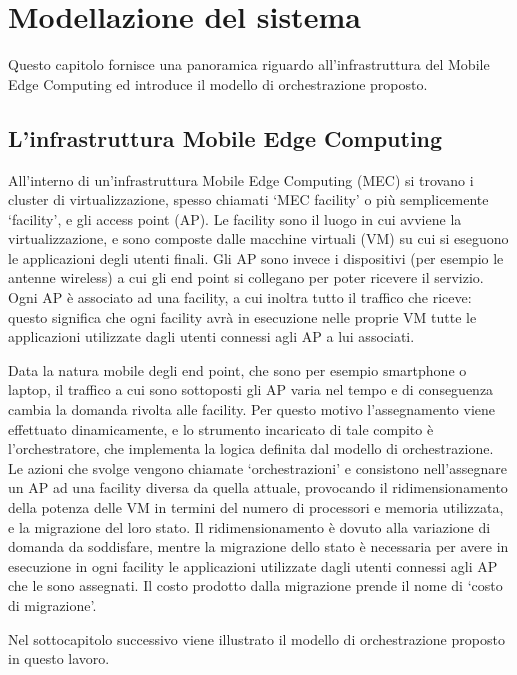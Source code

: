 \chapter{Modellazione del sistema}
\label{cap:modellazione-sistema}

Questo capitolo fornisce una panoramica riguardo all'infrastruttura del Mobile Edge Computing ed introduce il modello di orchestrazione proposto.


%
%
\section{L'infrastruttura Mobile Edge Computing}
\label{sec:infrastruttura-mec}

All'interno di un'infrastruttura Mobile Edge Computing (MEC) si trovano i cluster di virtualizzazione, spesso chiamati `MEC facility' o più semplicemente `facility', e gli access point (AP). Le facility sono il luogo in cui avviene la virtualizzazione, e sono composte dalle macchine virtuali (VM) su cui si eseguono le applicazioni degli utenti finali. Gli AP sono invece i dispositivi (per esempio le antenne wireless) a cui gli end point si collegano per poter ricevere il servizio. Ogni AP è associato ad una facility, a cui inoltra tutto il traffico che riceve: questo significa che ogni facility avrà in esecuzione nelle proprie VM tutte le applicazioni utilizzate dagli utenti connessi agli AP a lui associati.

Data la natura mobile degli end point, che sono per esempio smartphone o laptop, il traffico a cui sono sottoposti gli AP varia nel tempo e di conseguenza cambia la domanda rivolta alle facility. Per questo motivo l'assegnamento viene effettuato dinamicamente, e lo strumento incaricato di tale compito è l'orchestratore, che implementa la logica definita dal modello di orchestrazione. Le azioni che svolge vengono chiamate `orchestrazioni' e consistono nell'assegnare un AP ad una facility diversa da quella attuale, provocando il ridimensionamento della potenza delle VM in termini del numero di processori e memoria utilizzata, e la migrazione del loro stato. Il ridimensionamento è dovuto alla variazione di domanda da soddisfare, mentre la migrazione dello stato è necessaria per avere in esecuzione in ogni facility le applicazioni utilizzate dagli utenti connessi agli AP che le sono assegnati. Il costo prodotto dalla migrazione prende il nome di `costo di migrazione'.

Nel sottocapitolo successivo viene illustrato il modello di orchestrazione proposto in questo lavoro.



